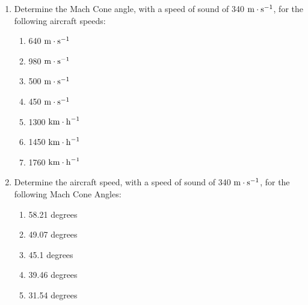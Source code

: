 \begin{eocexercises}{}
\begin{enumerate}
\item Determine the Mach Cone angle, with a speed of sound of 340 $\rm{m\cdot s}^{-1}$, for the following aircraft speeds:
\begin{enumerate}
\item 640 $\rm{m\cdot s}^{-1}$
\item 980 $\rm{m\cdot s}^{-1}$
\item 500 $\rm{m\cdot s}^{-1}$
\item 450 $\rm{m\cdot s}^{-1}$
\item 1300 $\rm{km\cdot h}^{-1}$
\item 1450 $\rm{km\cdot h}^{-1}$
\item 1760 $\rm{km\cdot h}^{-1}$
\end{enumerate}
\item Determine the aircraft speed, with a speed of sound of 340 $\rm{m\cdot s}^{-1}$, for the following Mach Cone Angles:
\begin{enumerate}
\item 58.21 degrees
\item 49.07 degrees
\item 45.1 degrees
\item 39.46 degrees
\item 31.54 degrees
\end{enumerate}
\end{enumerate}


\end{eocexercises}





